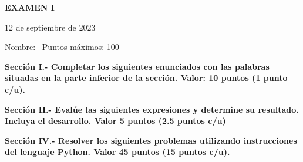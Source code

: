 \documentclass[10pt,addpoints]{exam}
\begin{document}
\begin{center}
  \sffamily\textbf{EXAMEN I}
\end{center}
\begin{flushright}
12 de septiembre de 2023
\end{flushright}
Nombre:~\makebox[4in]{\hrulefill}
Puntos máximos: 100

\begin{questions}
\begin{EnvFullwidth}
  \sffamily\textbf{Sección I.- Completar los siguientes enunciados con las
  palabras situadas en la parte inferior de la sección. Valor: 10 puntos
  (1 punto c/u).}
\end{EnvFullwidth}













\end{questions}

\begin{questions}
\begin{EnvFullwidth}
  \sffamily\textbf{Sección II.- Evalúe las siguientes expresiones y
  determine su resultado. Incluya el desarrollo. Valor 5 puntos (2.5 puntos
  c/u)}
\end{EnvFullwidth}





\end{questions}

\begin{questions}
\begin{EnvFullwidth}
  \sffamily\textbf{Sección IV.- Resolver los siguientes problemas utilizando
  instrucciones del lenguaje Python. Valor 45 puntos (15 puntos c/u).}
\end{EnvFullwidth}





\end{questions}
\end{document}

